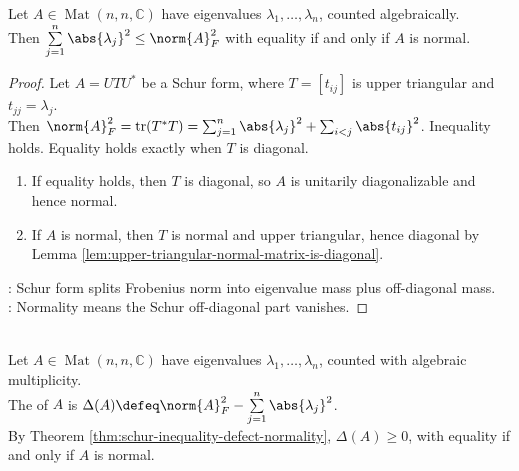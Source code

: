 \begin{theorem} \label{thm:schur-inequality-defect-normality} \\
Let $A\in\operatorname{Mat}(n,n,\mathbb{C})$ have eigenvalues $\lambda_1,\ldots,\lambda_n$, counted algebraically.\\
Then $\sum\limits_{j=1}^{n}\abs{\lambda_j}^2\leq\norm{A}_F^2$ with equality if and only if $A$ is normal.
\begin{proof}
Let $A=UTU^*$ be a Schur form, where $T=[t_{ij}]$ is upper triangular and $t_{jj}=\lambda_j$.\\
Then $\norm{A}_F^2=\operatorname{tr}(T^*T)=\sum_{j=1}^{n}\abs{\lambda_j}^2+\sum_{i<j}\abs{t_{ij}}^2$.
Inequality holds. Equality holds exactly when $T$ is diagonal.
\begin{enumerate}[label=\roman*.]
\setlength{\itemsep}{0pt}
\item[$(\Rightarrow)$] If equality holds, then $T$ is diagonal, so $A$ is unitarily diagonalizable and hence normal.
\item[$(\Leftarrow)$] If $A$ is normal, then $T$ is normal and upper triangular, hence diagonal by Lemma \ref{lem:upper-triangular-normal-matrix-is-diagonal}.
\end{enumerate}
: Schur form splits Frobenius norm into eigenvalue mass plus off-diagonal mass.\\
: Normality means the Schur off-diagonal part vanishes.
\end{proof}
\end{theorem}

\begin{definition} \label{def:defect-from-normality} \\
Let $A\in\operatorname{Mat}(n,n,\mathbb{C})$ have eigenvalues $\lambda_1,\ldots,\lambda_n$, counted with algebraic multiplicity.\\
The  of $A$ is $\Delta(A)\defeq\norm{A}_F^2-\sum\limits_{j=1}^{n}\abs{\lambda_j}^2$.\\
By Theorem \ref{thm:schur-inequality-defect-normality}, $\Delta(A)\geq0$, with equality if and only if $A$ is normal.
\end{definition}

